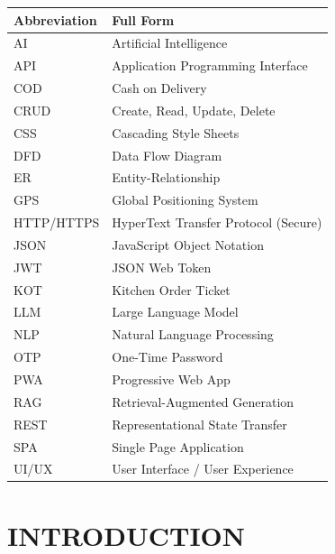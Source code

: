 \documentclass[12pt,a4paper]{report}
\begin{document}
\begin{table}[h!]
\centering
\begin{tabular}{|l|p{11cm}|}
\hline
\textbf{Abbreviation} & \textbf{Full Form} \\
\hline
AI & Artificial Intelligence \\
\hline
API & Application Programming Interface \\
\hline
COD & Cash on Delivery \\
\hline
CRUD & Create, Read, Update, Delete \\
\hline
CSS & Cascading Style Sheets \\
\hline
DFD & Data Flow Diagram \\
\hline
ER & Entity-Relationship \\
\hline
GPS & Global Positioning System \\
\hline
HTTP/HTTPS & HyperText Transfer Protocol (Secure) \\
\hline
JSON & JavaScript Object Notation \\
\hline
JWT & JSON Web Token \\
\hline
KOT & Kitchen Order Ticket \\
\hline
LLM & Large Language Model \\
\hline
NLP & Natural Language Processing \\
\hline
OTP & One-Time Password \\
\hline
PWA & Progressive Web App \\
\hline
RAG & Retrieval-Augmented Generation \\
\hline
REST & Representational State Transfer \\
\hline
SPA & Single Page Application \\
\hline
UI/UX & User Interface / User Experience \\
\hline
\end{tabular}
\end{table}

\newpage

\tableofcontents

\newpage

\setcounter{page}{1}

\chapter{INTRODUCTION}
\end{document}
